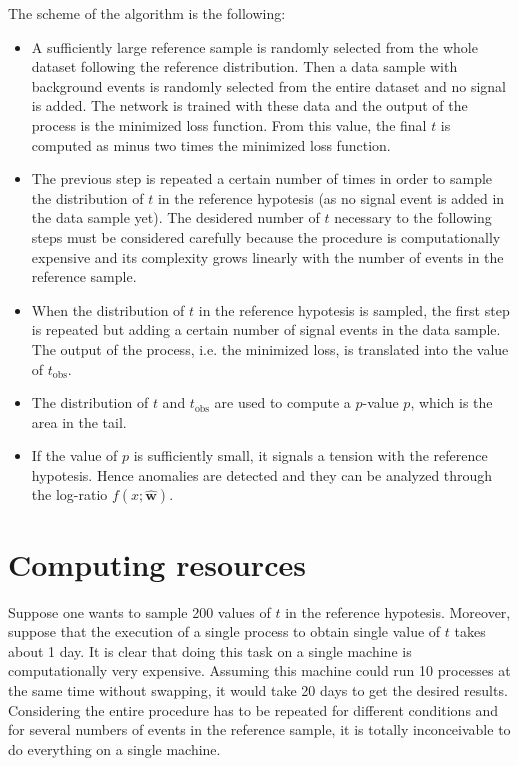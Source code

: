 The scheme of the algorithm is the following:
\begin{itemize}
	\item A sufficiently large reference sample is randomly selected from the whole dataset following the reference distribution. Then a data sample with background events is randomly selected from the entire dataset and no signal is added. The network is trained with these data and the output of the process is the minimized loss function. From this value, the final $t$ is computed as minus two times the minimized loss function.
	\item The previous step is repeated a certain number of times in order to sample the distribution of $t$ in the reference hypotesis (as no signal event is added in the data sample yet). The desidered number of $t$ necessary to the following steps must be considered carefully because the procedure is computationally expensive and its complexity grows linearly with the number of events in the reference sample.
	\item When the distribution of $t$ in the reference hypotesis is sampled, the first step is repeated but adding a certain number of signal events in the data sample. The output of the process, i.e. the minimized loss, is translated into the value of $t_\mathrm{obs}$.
	\item The distribution of $t$ and $t_\mathrm{obs}$ are used to compute a $p$-value $p$, which is the area in the tail.
	\item If the value of $p$ is sufficiently small, it signals a tension with the reference hypotesis. Hence anomalies are detected and they can be analyzed through the log-ratio $f(x;\hat{\mathbf{w}})$.
\end{itemize}





\section{Computing resources}
Suppose one wants to sample 200 values of $t$ in the reference hypotesis. Moreover, suppose that the execution of a single process to obtain single value of $t$ takes about 1 day. It is clear that doing this task on a single machine is computationally very expensive. Assuming this machine could run 10 processes at the same time without swapping, it would take 20 days to get the desired results. Considering the entire procedure has to be repeated for different conditions and for several numbers of events in the reference sample, it is totally inconceivable to do everything on a single machine.

